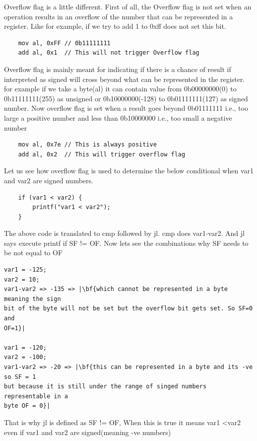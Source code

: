 \documentclass{article}
\begin{document}
Overflow flag is a little different. First of all, the Overflow flag is not set
when an operation results in an overflow of the number that can be represented
in a register. Like for example, if we try to add 1 to 0xff does not set this
bit.
\begin{verbatim}
    mov al, 0xFF // 0b11111111
    add al, 0x1  // This will not trigger Overflow flag
\end{verbatim}
Overflow flag is mainly meant for indicating if there is a chance of result if
interpreted as signed will cross beyond what can be represented in the register.
for example if we take a byte(al) it can contain value from 0b00000000(0) to
0b11111111(255) as unsigned or 0b10000000(-128) to 0b01111111(127) as signed
number. Now overflow flag is set when a result goes beyond 0b01111111 i.e., too
large a positive number and less than 0b10000000 i.e., too small a negative number

\begin{verbatim}
    mov al, 0x7e // This is always positive
    add al, 0x2  // This will trigger overflow flag
\end{verbatim}

Let us see how overflow flag is used to determine the below conditional when
var1 and var2 are signed numbers.
\begin{verbatim}
    if (var1 < var2) {
        printf("var1 < var2");
    }
\end{verbatim}
The above code is translated to cmp followed by jl. cmp does var1-var2. And jl
says execute printf if SF != OF. Now lets see the combinations why SF needs to
be not equal to OF
\begin{verbatim}
var1 = -125;
var2 = 10;
var1-var2 => -135 => |\bf{which cannot be represented in a byte meaning the sign
bit of the byte will not be set but the overflow bit gets set. So SF=0 and
OF=1}|

var1 = -120;
var2 = -100;
var1-var2 => -20 => |\bf{this can be represented in a byte and its -ve so SF = 1
but because it is still under the range of singed numbers representable in a
byte OF = 0}|
\end{verbatim}
That is why jl is defined as SF != OF, When this is true it means var1 \textless var2
even if var1 and var2 are signed(meaning -ve numbers)
\end{document}
